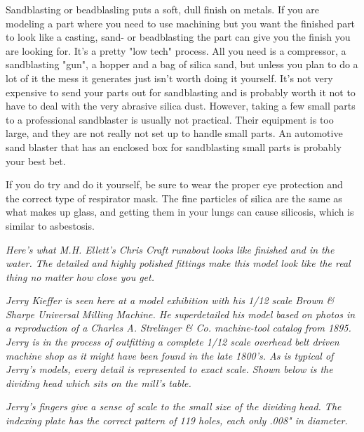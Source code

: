 
Sandblasting or beadblasling puts a soft, dull finish on metals. If you are
modeling a part where you need to use machining but you want the finished part
to look like a casting, sand- or beadblasting the part can give you the finish
you are looking for. It's a pretty "low tech" process. All you need is a
compressor, a sandblasting "gun", a hopper and a bag of silica sand, but unless
you plan to do a lot of it the mess it generates just isn't worth doing it
yourself. It's not very expensive to send your parts out for sandblasting and is
probably worth it not to have to deal with the very abrasive silica dust.
However, taking a few small parts to a professional sandblaster is usually not
practical. Their equipment is too large, and they are not really not set up to
handle small parts. An automotive sand blaster that has an enclosed box for
sandblasting small parts is probably your best bet.

If you do try and do it yourself, be sure to wear the proper eye protection and
the correct type of respirator mask. The fine particles of silica are the same
as what makes up glass, and getting them in your lungs can cause silicosis,
which is similar to asbestosis.

\bigskip
\textit{Here's what M.H. Ellett's Chris Craft runabout looks like finished and
in the water. The detailed and highly polished fittings make this model look
like the real thing no matter how close you get.}
\bigskip

\textit{Jerry Kieffer is seen here at a model exhibition with his 1/12 scale
Brown \& Sharpe Universal Milling Machine. He superdetailed his model based on
photos in a reproduction of a Charles A. Strelinger \& Co. machine-tool catalog
from 1895. Jerry is in the process of outfitting a complete 1/12 scale overhead
belt driven machine shop as it might have been found in the late 1800's. As is
typical of Jerry's models, every detail is represented to exact scale. Shown
below is the dividing head which sits on the mill's table.}
\bigskip

\textit{Jerry's fingers give a sense of scale to the small size of the dividing
head. The indexing plate has the correct pattern of 119 holes, each only .008"
in diameter.}

\secup
